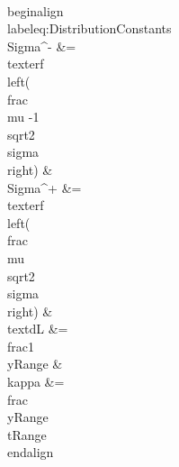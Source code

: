 \\begin{align}\\label{eq:DistributionConstants}
\\Sigma^- &= \\text{erf}\\left(\\frac{\\mu -1}{\\sqrt{2} \\sigma }\\right) &
 \\Sigma^+ &= \\text{erf}\\left(\\frac{\\mu }{\\sqrt{2} \\sigma }\\right) &
  \\text{dL} &= \\frac{1}{\\yRange} &
  \\kappa &= \\frac{\\yRange}{\\tRange} 
\\end{align}

